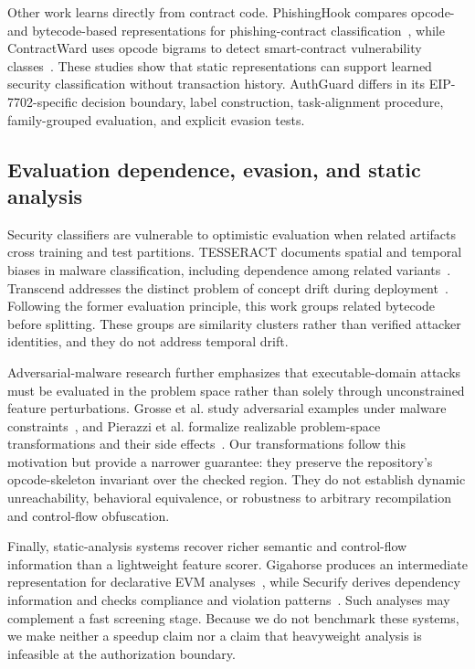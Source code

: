 \documentclass[conference]{IEEEtran}
\begin{document}
Other work learns directly from contract code. PhishingHook compares opcode- and bytecode-based representations for phishing-contract classification~\cite{derosa2025phishinghook}, while ContractWard uses opcode bigrams to detect smart-contract vulnerability classes~\cite{wang2021contractward}. These studies show that static representations can support learned security classification without transaction history. AuthGuard differs in its EIP-7702-specific decision boundary, label construction, task-alignment procedure, family-grouped evaluation, and explicit evasion tests.

\subsection{Evaluation dependence, evasion, and static analysis}

Security classifiers are vulnerable to optimistic evaluation when related artifacts cross training and test partitions. TESSERACT documents spatial and temporal biases in malware classification, including dependence among related variants~\cite{pendlebury2019tesseract}. Transcend addresses the distinct problem of concept drift during deployment~\cite{jordaney2017transcend}. Following the former evaluation principle, this work groups related bytecode before splitting. These groups are similarity clusters rather than verified attacker identities, and they do not address temporal drift.

Adversarial-malware research further emphasizes that executable-domain attacks must be evaluated in the problem space rather than solely through unconstrained feature perturbations. Grosse et al. study adversarial examples under malware constraints~\cite{grosse2017adversarial}, and Pierazzi et al. formalize realizable problem-space transformations and their side effects~\cite{pierazzi2020problemspace}. Our transformations follow this motivation but provide a narrower guarantee: they preserve the repository's opcode-skeleton invariant over the checked region. They do not establish dynamic unreachability, behavioral equivalence, or robustness to arbitrary recompilation and control-flow obfuscation.

Finally, static-analysis systems recover richer semantic and control-flow information than a lightweight feature scorer. Gigahorse produces an intermediate representation for declarative EVM analyses~\cite{grech2019gigahorse}, while Securify derives dependency information and checks compliance and violation patterns~\cite{tsankov2018securify}. Such analyses may complement a fast screening stage. Because we do not benchmark these systems, we make neither a speedup claim nor a claim that heavyweight analysis is infeasible at the authorization boundary.
\end{document}
